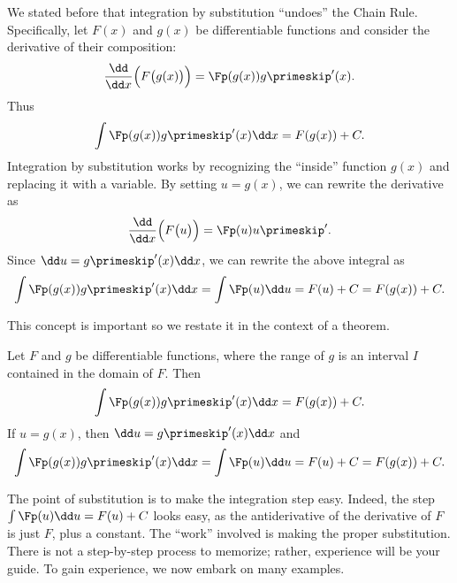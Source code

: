 We stated before that integration by substitution ``undoes'' the Chain Rule. Specifically, let $F(x)$ and $g(x)$ be differentiable functions and consider the derivative of their composition:
\[\frac{\dd}{\dd x}\Bigl(F\bigl(g(x)\bigr)\Bigr) = \Fp(g(x))g\primeskip'(x).\]
Thus\vspace{-.3\baselineskip}
\[\int \Fp(g(x))g\primeskip'(x)\dd x = F(g(x)) + C.\]
Integration by substitution works by recognizing the ``inside'' function $g(x)$ and replacing it with a variable. By setting $u=g(x)$, we can rewrite the derivative as\vspace{-.3\baselineskip}
\[\frac{\dd}{\dd x}\Bigl(F\bigl(u\bigr)\Bigr) = \Fp(u)u\primeskip'.\]
Since $\dd u = g\primeskip'(x)\dd x$, we can rewrite the above integral as
\[\int \Fp(g(x))g\primeskip'(x)\dd x = \int \Fp(u) \dd u = F(u)+C = F(g(x))+ C.\]
	
This concept is important so we restate it in the context of a theorem.

\begin{theorem}\label{thm:subst}%
Let $F$ and $g$ be differentiable functions, where the range of $g$ is an interval $I$ contained in the domain of $F$. Then 
\[\int \Fp(g(x))g\primeskip'(x)\dd x = F(g(x)) + C.\]
If $u = g(x)$, then $\dd u = g\primeskip'(x)\dd x$ and 
\[\int \Fp(g(x))g\primeskip'(x)\dd x = \int \Fp(u)\dd u = F(u)+C = F(g(x))+C.\]
\end{theorem}

The point of substitution is to make the integration step easy. Indeed, the step $\int \Fp(u)\dd u = F(u) + C$ looks easy, as the antiderivative of the derivative of $F$ is just $F$, plus a constant. The ``work'' involved is making the proper substitution. There is not a step-by-step process to memorize; rather, experience will be your guide. To gain experience, we now embark on many examples.


